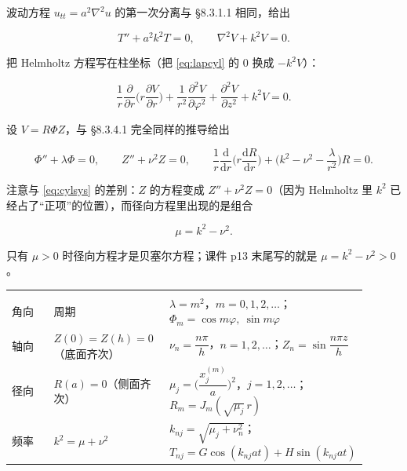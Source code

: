 

\label{sec:835}



波动方程 $u_{tt}=a^2\nabla^2u$ 的第一次分离与 \S8.3.1.1 相同，给出

\[
T''+a^2k^2T=0,
\qquad
\nabla^2V+k^2V=0 .
\]

把 Helmholtz 方程写在柱坐标（把 \eqref{eq:lapcyl} 的 $0$ 换成 $-k^2V$）：

\begin{equation}
\frac1r\frac{\partial}{\partial r}\Big(r\frac{\partial V}{\partial r}\Big)+\frac1{r^2}\frac{\partial^2V}{\partial\varphi^2}+\frac{\partial^2V}{\partial z^2}+k^2V=0 .
\label{eq:helmcyl}
\end{equation}

设 $V=R\Phi Z$，与 \S8.3.4.1 完全同样的推导给出

\begin{equation}
\Phi''+\lambda\Phi=0,\qquad
Z''+\nu^2Z=0,\qquad
\frac1r\frac{\mathrm d}{\mathrm dr}\Big(r\frac{\mathrm dR}{\mathrm dr}\Big)+\Big(k^2-\nu^2-\frac{\lambda}{r^2}\Big)R=0 .
\label{eq:helmsys}
\end{equation}

注意与 \eqref{eq:cylsys} 的差别：$Z$ 的方程变成 $Z''+\nu^2Z=0$（因为 Helmholtz 里 $k^2$ 已经占了“正项”的位置），而径向方程里出现的是组合

\begin{equation}
\mu=k^2-\nu^2 .
\label{eq:mudef}
\end{equation}

只有 $\mu>0$ 时径向方程才是贝塞尔方程；课件 p13 末尾写的就是 $\mu=k^2-\nu^2>0$。


\begin{center}
\tabtop
\begin{tabular}{@{}L{0.18\linewidth}L{0.34\linewidth}L{0.38\linewidth}@{}}
 &  &  \\
\tabmidrule
角向 & 周期 & $\lambda=m^2$，$m=0,1,2,\dots$；$\Phi_m=\cos m\varphi,\ \sin m\varphi$ \\
轴向 & $Z(0)=Z(h)=0$（底面齐次） & $\nu_n=\dfrac{n\pi}{h}$，$n=1,2,\dots$；$Z_n=\sin\dfrac{n\pi z}{h}$ \\
径向 & $R(a)=0$（侧面齐次） & $\mu_j=\Big(\dfrac{x_j^{(m)}}{a}\Big)^2$，$j=1,2,\dots$；$R_m=J_m(\sqrt{\mu_j}\,r)$ \\
频率 & $k^2=\mu+\nu^2$ & $k_{nj}=\sqrt{\mu_j+\nu_n^2}$；$T_{nj}=G\cos(k_{nj}at)+H\sin(k_{nj}at)$ \\
\end{tabular}
\tabbot
\end{center}

